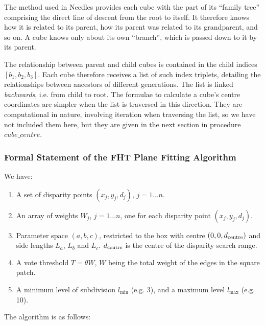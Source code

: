   The method used in Needles provides each cube with the part of its
  ``family tree'' comprising the direct line of descent from the root
  to itself. It therefore knows how it is related to its parent, how
  its parent was related to its grandparent, and so on. A cube knows
  only about its own ``branch'', which is passed down to it by its parent.

  The relationship between parent and child cubes is contained in the
  child indices $[b_1, b_2, b_3]$.
  Each cube therefore receives a list of such index triplets, detailing
  the relationships between ancestors of different generations.
  The list is linked {\em backwards}, i.e. from child to root. The formulae
  to calculate a cube's centre coordinates are simpler when the list
  is traversed in this direction. They are computational in nature,
  involving iteration when traversing the list, so we have not included
  them here, but they are given in the next section in procedure
  $cube\_centre$.
 \subsubsection{Formal Statement of the FHT Plane Fitting Algorithm}
  \label{formal_FHT}
  We have:
  \begin{enumerate}
     \item A set of disparity points $(x_j , y_j , d_j )$, $j=1 \ldots n$.

     \item An array of weights $W_j$, $j=1 \ldots n$, one for each
	   disparity point $(x_j , y_j , d_j )$.

     \item Parameter space $(a,b,c)$, restricted to the box with centre
	   $(0,0,d_{\rm centre})$ and side lengths $L_a$, $L_b$ and $L_c$.
	   $d_{\rm centre}$ is the centre of the disparity search range.

     \item A vote threshold $T= \theta W$, $W$ being the total weight of
	   the edges in the square patch.

     \item A minimum level of subdivision $l_{\min}$ (e.g. 3), and a
	   maximum level $l_{\max}$ (e.g. 10).
  \end{enumerate}
  The algorithm is as follows:


